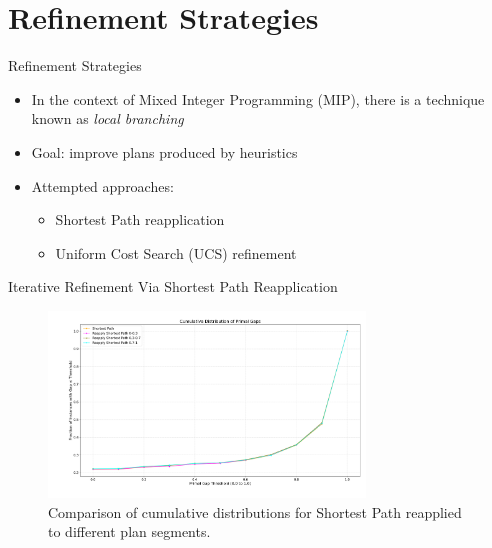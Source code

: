 \documentclass[aspectratio=169,xcolor=dvipsnames]{beamer}
\begin{document}
\section{Refinement Strategies}

\begin{frame}{Refinement Strategies}
	\begin{itemize}
		\item In the context of Mixed Integer Programming (MIP), there is a technique known as \textit{local branching} \cite{fischetti2003local}
		\item Goal: improve plans produced by heuristics
		\item Attempted approaches:
		      \begin{itemize}
			      \item Shortest Path reapplication
			      \item Uniform Cost Search (\textsc{UCS}) refinement \cite{felner2011position}
		      \end{itemize}
	\end{itemize}
\end{frame}


\begin{frame}{Iterative Refinement Via Shortest Path Reapplication}
	\begin{figure}[ht]
		\centering
		\includegraphics[width=0.75\textwidth]{../thesis/images/reapply_full.png}
		\caption{Comparison of cumulative distributions for Shortest Path reapplied to different plan segments.}
		\label{fig:reapply}
	\end{figure}
\end{frame}

\end{document}
